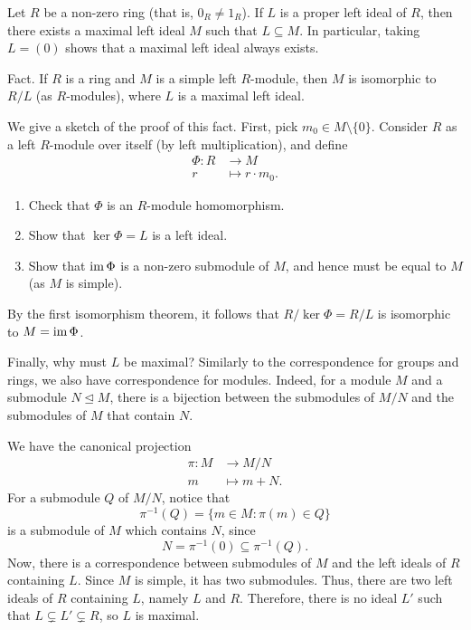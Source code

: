 \begin{exercise}
Let $R$ be a non-zero ring (that is, $0_R \neq 1_R$). If $L$ is a proper left ideal of $R$, then 
there exists a maximal left ideal $M$ such that $L \subseteq M$. In particular, taking 
$L = (0)$ shows that a maximal left ideal always exists. 
\end{exercise}

{\sc Fact.} If $R$ is a ring and $M$ is a simple left $R$-module, then $M$ is isomorphic to 
$R/L$ (as $R$-modules), where $L$ is a maximal left ideal. 

We give a sketch of the proof of this fact. First, pick $m_0 \in M \setminus \{0\}$. Consider 
$R$ as a left $R$-module over itself (by left multiplication), and define 
\begin{align*}
    \Phi : R &\to M \\ r &\mapsto r \cdot m_0. 
\end{align*}
\begin{enumerate}[(1)]
    \item Check that $\Phi$ is an $R$-module homomorphism. 
    \item Show that $\ker\Phi = L$ is a left ideal.
    \item Show that $\operatorname{im}\Phi$ is a non-zero submodule of $M$, and hence must be equal to $M$ 
    (as $M$ is simple).
\end{enumerate}
By the first isomorphism theorem, it follows that $R/\ker\Phi = R/L$ is isomorphic to $M = \operatorname{im}\Phi$. 

Finally, why must $L$ be maximal? Similarly to the correspondence for groups and rings, we also have 
correspondence for modules. Indeed, for a module $M$ and a submodule $N \trianglelefteq M$, there 
is a bijection between the submodules of $M/N$ and the submodules of $M$ that contain $N$. 

We have the canonical projection 
\begin{align*}
    \pi : M &\to M/N \\ m &\mapsto m + N.
\end{align*} 
For a submodule $Q$ of $M/N$, notice that 
\[ \pi^{-1}(Q) = \{m \in M : \pi(m) \in Q\} \] 
is a submodule of $M$ which contains $N$, since 
\[ N = \pi^{-1}(0) \subseteq \pi^{-1}(Q). \]
Now, there is a correspondence between submodules of $M$ and the left ideals of $R$ containing $L$. 
Since $M$ is simple, it has two submodules. Thus, there are two left ideals of $R$ containing $L$, namely $L$ and $R$. Therefore, there is no ideal $L'$ such that $L \subsetneq L' \subsetneq R$, so $L$ is 
maximal.

